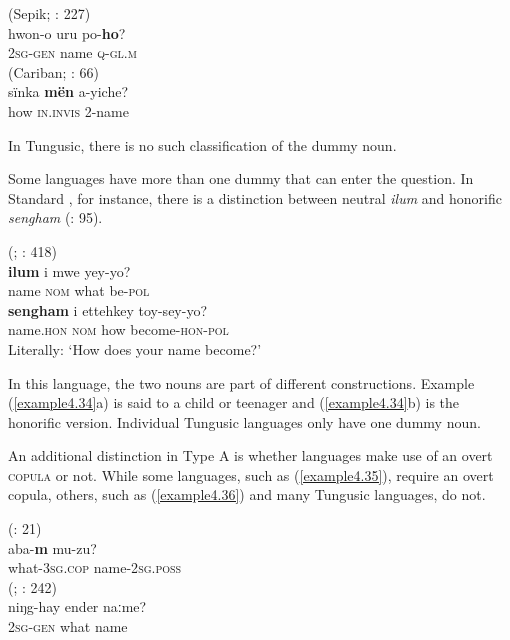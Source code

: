 \documentclass[output=paper,colorlinks,citecolor=brown]{langscibook}
\begin{document}
\ea
    \label{example4.32}
     (Sepik; \citealt{Lock2011}: 227)\\
    \gll hwon-o		uru		po-\textbf{ho}?\\
    2\textsc{sg-gen}		name 	\textsc{q-gl.m}\\
\ex
    \label{example4.33}
     (Cariban; \citealt{Payne2013}: 66)\\
    \gll sïnka	\textbf{mën}	a-yiche?\\
    how		\textsc{in.invis}	2-name\\
    \z

\noindent In Tungusic, there is no such classification of the dummy noun.

Some languages have more than one dummy that can enter the question. In Standard , for instance, there is a distinction between neutral \textit{ilum} and honorific \textit{sengham} (\citealt{Song2005}: 95).

\ea
    \label{example4.34}
     (; \citealt{Sohn1999}: 418)\\
    \ea
    \gll \textbf{ilum}	i		mwe	yey-yo?\\
    name	\textsc{nom}		what	be-\textsc{pol}\\

    \ex
    \gll \textbf{sengham}	i		ettehkey		toy-sey-yo?\\
    name.\textsc{hon}		\textsc{nom}		how			become-\textsc{hon-pol}\\
    \glt Literally: ‘How does your name become?’
    \z
\z

\noindent In this language, the two nouns are part of different constructions. Example (\ref{example4.34}a) is said to a child or teenager and (\ref{example4.34}b) is the honorific version. Individual Tungusic languages only have one dummy noun.

An additional distinction in Type A is whether languages make use of an overt \textsc{copula} or not. While some languages, such as  (\ref{example4.35}), require an overt copula, others, such as  (\ref{example4.36}) and many Tungusic languages, do not.

\ea
    \label{example4.35}
     (\citealt{Black2007}: 21)\\
    \gll aba-\textbf{m}			mu-zu?\\
    what-3\textsc{sg.cop}		name-2\textsc{sg.poss}\\
\ex
    \label{example4.36}
     (; \citealt{Kobayashi2017}: 242)\\
    \gll niŋg-hay	ender	naːme?\\
    2\textsc{sg-gen} 		what		name\\
    \z
\end{document}
